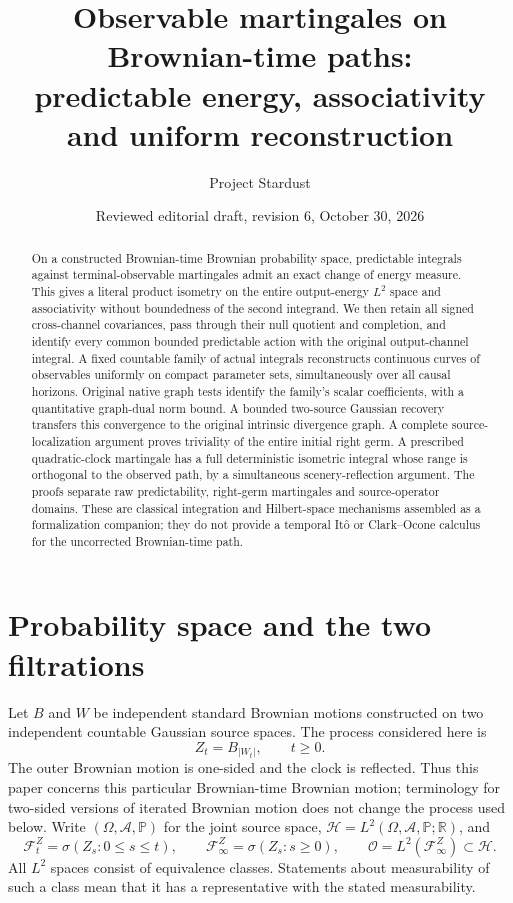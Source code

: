 \documentclass[11pt]{article}
\title{Observable martingales on Brownian-time paths:\\
predictable energy, associativity and uniform reconstruction}
\author{Project Stardust}
\date{Reviewed editorial draft, revision 6, October 30, 2026}
\theoremstyle{remark}\newtheorem{remark}[theorem]{Remark}
\newcommand{\R}{\mathbb R}
\newcommand{\Pp}{\mathbb P}
\newcommand{\HH}{\mathcal H}
\newcommand{\OO}{\mathcal O}
\begin{document}
\maketitle
\begin{abstract}
On a constructed Brownian-time Brownian probability space, predictable
integrals against terminal-observable martingales admit an exact change of
energy measure. This gives a literal product isometry on the entire
output-energy $L^2$ space and associativity without boundedness of the
second integrand. We then retain all signed cross-channel covariances,
pass through their null quotient and completion, and identify every common
bounded predictable action with the original output-channel integral.
A fixed countable family of actual integrals reconstructs continuous
curves of observables uniformly on compact parameter sets, simultaneously
over all causal horizons. Original native graph tests identify the
family's scalar coefficients, with a quantitative graph-dual norm bound.
A bounded two-source Gaussian recovery transfers
this convergence to the original intrinsic divergence graph. A complete source-localization argument proves triviality of the entire initial right germ. A prescribed quadratic-clock martingale has a full deterministic
isometric integral whose range is orthogonal to the observed path,
by a simultaneous scenery-reflection argument. The proofs
separate raw predictability, right-germ martingales and source-operator
domains. These are classical integration and Hilbert-space mechanisms
assembled as a formalization companion; they do not provide a temporal
It\^o or Clark--Ocone calculus for the uncorrected Brownian-time path.
\end{abstract}

\section{Probability space and the two filtrations}
Let $B$ and $W$ be independent standard Brownian motions constructed on
two independent countable Gaussian source spaces. The process considered
here is
\[
 Z_t=B_{|W_t|},\qquad t\geq0.
\]
The outer Brownian motion is one-sided and the clock is reflected.
Thus this paper concerns this particular Brownian-time Brownian motion;
terminology for two-sided versions of iterated Brownian motion does not
change the process used below. Write $(\Omega,\mathcal A,\Pp)$ for the
joint source space, $\HH=L^2(\Omega,\mathcal A,\Pp;\R)$, and
\[
 \mathcal F_t^Z=\sigma(Z_s:0\leq s\leq t),\qquad
 \mathcal F_\infty^Z=\sigma(Z_s:s\geq0),\qquad
 \OO=L^2(\mathcal F_\infty^Z)\subset\HH.
\]
All $L^2$ spaces consist of equivalence classes. Statements about
measurability of such a class mean that it has a representative with the
stated measurability.
\end{document}
